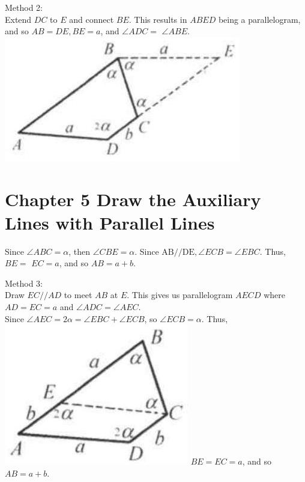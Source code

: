 \documentclass[10pt]{article}
\begin{document}
Method 2:\\
Extend \(D C\) to \(E\) and connect \(B E\). This results in \(A B E D\) being a parallelogram, and so \(A B=D E, B E=a\), and \(\angle A D C=\) \(\angle A B E\).\\
\includegraphics[max width=\textwidth, center]{2025_04_17_97bc1f7e44d93c271a88g-110(1)}

\section*{Chapter 5 Draw the Auxiliary Lines with Parallel Lines}
Since \(\angle A B C=\alpha\), then \(\angle C B E=\alpha\). Since \(\mathrm{AB} / / \mathrm{DE}, \angle E C B=\angle E B C\). Thus, \(B E=\) \(E C=a\), and so \(A B=a+b\).

Method 3:\\
Draw \(E C / / A D\) to meet \(A B\) at \(E\). This gives us parallelogram \(A E C D\) where \(A D=E C=a\) and \(\angle A D C=\angle A E C\).\\
Since \(\angle A E C=2 \alpha=\angle E B C+\angle E C B\), so \(\angle E C B=\alpha\). Thus,\\
\includegraphics[max width=\textwidth]{2025_04_17_97bc1f7e44d93c271a88g-111} \(B E=E C=a\), and so \(A B=a+b\).
\end{document}
